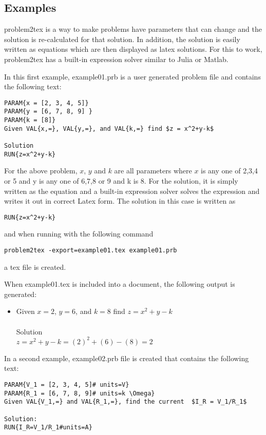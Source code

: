 \documentclass{article}
\newcommand{\skipLine}{\\[0ex]}
\begin{document}
\subsection{Examples}

problem2tex is a way to make problems have parameters that can change and the solution is re-calculated for that solution.  In addition, the solution is easily written as equations which are then displayed as latex solutions.  For this to work, problem2tex has a built-in expression solver similar to Julia or Matlab.   

In this first example, example01.prb is a user generated problem file and contains the following text:
\begin{lstlisting}
PARAM{x = [2, 3, 4, 5]}
PARAM{y = [6, 7, 8, 9] }
PARAM{k = [8]}
Given VAL{x,=}, VAL{y,=}, and VAL{k,=} find $z = x^2+y-k$

Solution
RUN{z=x^2+y-k}
\end{lstlisting}

For the above problem, $x$, $y$ and $k$ are all parameters where $x$ is any one of 2,3,4 or 5 and
y is any one of 6,7,8 or 9 and k is 8.  For the solution, it is simply written as the equation and a built-in expression solver solves the expression and writes it out in correct Latex form.  The solution in this case is written as 

\begin{lstlisting}
RUN{z=x^2+y-k}
\end{lstlisting}


and when running with the following command\\
\begin{lstlisting}
problem2tex -export=example01.tex example01.prb
\end{lstlisting}
a tex file is created. 

When example01.tex is included into a document, the following output is generated:
\begin{itemize}
\item[] %
Given \mbox{$x=2$}, \mbox{$y=6$}, and \mbox{$k=8$} find $z = x^2+y-k$\\
\skipLine
Solution\\
\mbox{$z=x^2+y-k  = (2)^2+(6)-(8) = 2$}\\
\end{itemize}


In a second example, example02.prb file is created that contains the following text:
\begin{lstlisting}
PARAM{V_1 = [2, 3, 4, 5]# units=V}
PARAM{R_1 = [6, 7, 8, 9]# units=k \Omega}
Given VAL{V_1,=} and VAL{R_1,=}, find the current  $I_R = V_1/R_1$

Solution:
RUN{I_R=V_1/R_1#units=A}
\end{lstlisting}
\end{document}
